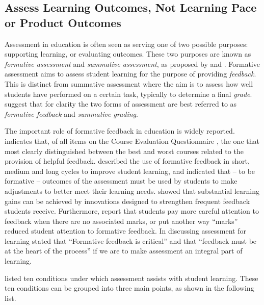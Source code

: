 

\subsection{Assess Learning Outcomes, Not Learning Pace or Product Outcomes} %
\label{ssub:aim_to_assess_learning_outcomes_not_learning_pace_or_product_outcomes_}

Assessment in education is often seen as serving one of two possible purposes: supporting learning, or evaluating outcomes. These two purposes are known as \emph{formative assessment} and \emph{summative assessment}, as proposed by \citet{Scriven:1967} and \citet{Bloom:1969}. Formative assessment aims to assess student learning for the purpose of providing \emph{feedback}. This is distinct from summative assessment where the aim is to assess how well students have performed on a certain task, typically to determine a final \emph{grade}. \citet{Biggs:2007} suggest that for clarity the two forms of assessment are best referred to as \emph{formative feedback} and \emph{summative grading}.

The important role of formative feedback in education is widely reported. \citet{Ramsden:1992} indicates that, of all items on the Course Evaluation Questionnaire \cite{Ramsden:1991}, the one that most clearly distinguished between the best and worst courses related to the provision of helpful feedback. \citet{William:2006} described the use of formative feedback in short, medium and long cycles to improve student learning, and indicated that -- to be formative -- outcomes of the assessment must be used by students to make adjustments to better meet their learning needs. \citet{Black:1998} showed that substantial learning gains can be achieved by innovations designed to strengthen frequent feedback students receive. Furthermore, \citet{Black:1998} report that students pay more careful attention to feedback when there are no associated marks, or put another way ``marks'' reduced student attention to formative feedback. In discussing assessment for learning \citet{Brown:2004} stated that ``Formative feedback is critical'' and that ``feedback must be at the heart of the process'' if we are to make assessment an integral part of learning. 

\citet{Gibbs:2004} listed ten conditions under which assessment assists with student learning. These ten conditions can be grouped into three main points, as shown in the following list.


